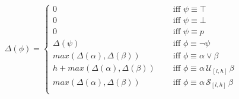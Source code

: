 \documentclass[10pt,a4paper]{article}
\begin{document}
\begin{align*}
\Delta(\phi) = \left\lbrace
\begin{aligned}
0 & \quad \text{ iff } \psi \equiv \top \\
0 & \quad \text{ iff } \psi \equiv \bot \\
0 & \quad \text{ iff } \psi \equiv p \\
\Delta(\psi) & \quad \text{ iff } \phi \equiv \neg \psi \\
max(\Delta(\alpha),\Delta(\beta)) & \quad \text{ iff } \phi \equiv \alpha \vee \beta \\
h + max(\Delta(\alpha),\Delta(\beta)) & \quad \text{ iff } \phi \equiv \alpha\, \mathcal{U}_{[l,h]}\, \beta \\
max(\Delta(\alpha),\Delta(\beta)) & \quad \text{ iff } \phi \equiv \alpha\, \mathcal{S}_{[l,h]}\, \beta \\
\end{aligned} \right. 
\end{align*}
\end{document}
